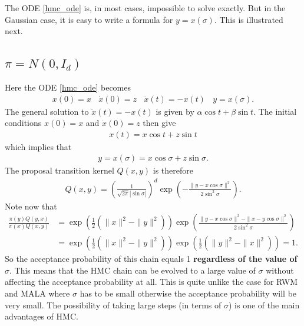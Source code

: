 \documentclass{scrartcl}
\begin{document}
The ODE \eqref{hmc_ode} is, in most cases, impossible to solve
exactly. But in the Gaussian case, it is easy to write a formula for
$y = x(\sigma)$. This is illustrated next.

\subsection{$\pi = N(0, I_d)$}
Here the ODE \eqref{hmc_ode} becomes
\begin{align*}
  x(0) = x~~~~ \dot{x}(0) = z ~~~~ \ddot{x}(t) = -x(t) ~~~~ y = x(\sigma). 
\end{align*}
The general solution to $\ddot{x}(t) = -x(t)$ is given by $\alpha \cos
t + \beta \sin t$. The initial conditions $x(0) = x$ and $\dot{x}(0) =
z$ then give
\begin{align*}
  x(t) = x \cos t + z \sin t
\end{align*}
which implies that
\begin{align*}
  y = x(\sigma) = x \cos \sigma + z \sin \sigma. 
\end{align*}
The proposal transition kernel $Q(x, y)$ is therefore
\begin{align*}
  Q(x, y) = \left(\frac{1}{\sqrt{2 \pi} |\sin \sigma|} \right)^d \exp
  \left(- \frac{\|y - x \cos \sigma\|^2}{2 \sin^2 \sigma} \right).
\end{align*}
Note now that
\begin{align*}
  \frac{\pi(y) Q(y, x)}{\pi(x) Q(x, y)} &= \exp \left(\frac{1}{2}
                                          (\|x\|^2 - \|y\|^2) \right)
                                          \exp \left(\frac{\|y - x \cos
                                          \sigma\|^2- \|x - y \cos
                                          \sigma\|^2}{2 \sin^2 \sigma}
                                          \right) \\
  &= \exp \left(\frac{1}{2}
                                          (\|x\|^2 - \|y\|^2) \right)\exp \left(\frac{1}{2}
                                          (\|y\|^2 - \|x\|^2) \right)
    = 1. 
\end{align*}
So the acceptance probability of this chain equals 1
\textbf{regardless of the value of $\sigma$}. This means that the HMC
chain can be evolved to a large value of $\sigma$ without affecting
the acceptance probability at all. This is quite unlike the case for
RWM and MALA where $\sigma$ has to be small otherwise the acceptance
probability will be very small. The possibility of taking large steps
(in terms of $\sigma$) is one of the main advantages of HMC.
\end{document}
